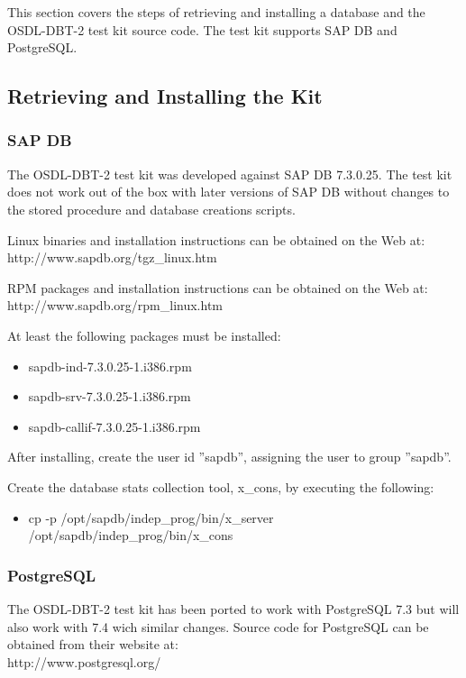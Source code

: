 \documentclass{article}
\begin{document}
This section covers the steps of retrieving and installing a database and the
OSDL-DBT-2 test kit source code.  The test kit supports SAP DB and PostgreSQL.

\subsection{Retrieving and Installing the Kit}

\subsubsection{SAP DB}

The OSDL-DBT-2 test kit was developed against SAP DB 7.3.0.25.  The test kit
does not work out of the box with later versions of SAP DB without changes
to the stored procedure and database creations scripts.

\noindent
Linux binaries and installation instructions can be obtained on the Web at:
http://www.sapdb.org/tgz\_linux.htm

\noindent
RPM packages and installation instructions can be obtained on the Web at:
http://www.sapdb.org/rpm\_linux.htm

\noindent
At least the following packages must be installed:
\begin{itemize}
\item sapdb-ind-7.3.0.25-1.i386.rpm
\item sapdb-srv-7.3.0.25-1.i386.rpm
\item sapdb-callif-7.3.0.25-1.i386.rpm
\end{itemize}

\noindent
After installing, create the user id ''sapdb'', assigning the user to group
''sapdb''.

\noindent
Create the database stats collection tool, x\_cons, by executing the
following:
\begin{itemize}
\item cp -p /opt/sapdb/indep\_prog/bin/x\_server
      /opt/sapdb/indep\_prog/bin/x\_cons
\end{itemize}

\subsubsection{PostgreSQL}

The OSDL-DBT-2 test kit has been ported to work with PostgreSQL 7.3 but will
also work with 7.4 wich similar changes.  Source code for PostgreSQL can be
obtained from their website at: \\
\indent http://www.postgresql.org/
\end{document}

